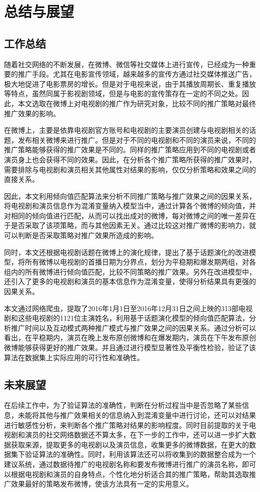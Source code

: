 \chapter{总结与展望}

\section{工作总结}

随着社交网络的不断发展，在微博、微信等社交媒体上进行宣传，已经成为一种重要的推广手段。尤其在电影宣传领域，越来越多的宣传方通过社交媒体推送广告，极大地促进了电影票房的增长。但是对于电视来说，由于其播放周期长、重复播放等特点，虽然同属于影视剧领域，但是与电影的宣传策存在一定的不同之处。因此，本文选取在微博上对电视剧的推广作为研究对象，比较不同的推广策略对最终推广效果的影响。

在微博上，主要是依靠电视剧官方账号和电视剧的主要演员创建与电视剧相关的话题，发布相关微博来进行推广。但是对于不同的电视剧和不同的演员来说，不同的推广策略能够获得的推广效果是不同的。同样的推广策略应用到不同的电视剧或者演员身上也会获得不同的效果。因此，在分析各个推广策略所获得的推广效果时，需要排除与电视剧和演员相关其他属性对结果的影响，仅仅分析策略和效果之间的直接关系。

因此，本文利用倾向值匹配算法来分析不同推广策略与推广效果之间的因果关系，将电视剧和演员信息作为混淆变量纳入模型当中，通过计算各个微博的倾向值，并对相同的倾向值进行匹配，从而可以找出成对的微博，每对微博之间的唯一差异在于是否采取了该项策略，而与其他因素无关。通过比较这对推广微博的影响力，就可以判断是否采取策略对推广效果所造成的影响。

同时，本文还根据电视剧话题在微博上的演化规律，提出了基于话题演化的改进模型，将所有微博以电视剧的首播日期为分界点，划分为平稳期和爆发期两组，对各组内的所有微博进行倾向值匹配，比较不同策略的推广效果。另外在改进模型中，还引入了更多的电视剧和演员的基本信息作为混淆变量，使得分析结果具有更强的因果关系。

本文通过网络爬虫，提取了2016年1月1日至2016年12月31日之间上映的313部电视剧和这些电视剧的1121位主演姓名，利用基于话题演化模型的倾向值匹配算法，分析推广时间以及互动模式两种推广模式与推广效果之间的因果关系。通过分析可以看出，在平稳期内，演员在晚上发布原创微博和在爆发期内，演员在下午发布原创微博能够获得更好的推广效果。并且通过进行模型显著性及平衡性检验，验证了该算法在数据集上实际应用的可行性和准确性。

\section{未来展望}

在后续工作中，为了验证算法的准确性，判断在分析过程当中是否忽略了某些信息，未能将其他与推广效果相关的信息纳入到混淆变量中进行讨论，还可以对结果进行敏感性分析，来判断各个推广策略对结果的影响程度。同时目前提取的关于电视剧和演员的社交网络数据还不算太多，在下一步的工作中，还可以进一步扩大数据获取来源，提取更多的电视剧以及演员信息，收集更多的微博数据，在更大的数据集下验证算法的准确性。同时，利用该算法还可以将收集到的数据整合成为一个建议系统，通过数据待推广的电视剧名称和要发布微博进行推广的演员名称，即可以根据电视剧和演员的自身特点，个性化地分析适合其的推广策略，帮助其选取推广效果最好的策略发布微博，使该方法具有一定的实用意义。